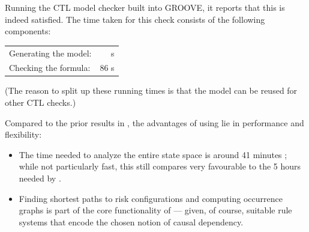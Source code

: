 Running the CTL model checker built into GROOVE, it reports that this is indeed satisfied. The time taken for this check consists of the following components:

\begin{center}
\begin{tabular}{lr}
Generating the model: &  s \\
Checking the formula: & 86 s 
\end{tabular}
\end{center}
%
(The reason to split up these running times is that the model can be reused for other CTL checks.)

\medskip\noindent Compared to the prior results in \cite{DBLP:conf/cmsb/BowlesBBFGM24}, the advantages of using \GROOVE lie in performance and flexibility:
\begin{itemize}
\item The time needed to analyze the entire state space is around 41 minutes \GROOVE; while not particularly fast, this still compares very favourable to the 5 hours needed by \BioResolve.

\item Finding shortest paths to risk configurations and computing occurrence graphs is part of the core functionality of \GROOVE --- given, of course, suitable rule systems that encode the chosen notion of causal dependency.
\end{itemize}

